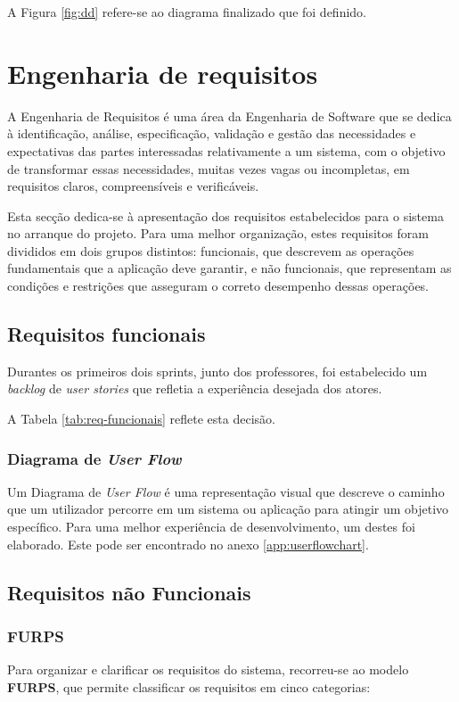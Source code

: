 A Figura \ref{fig:dd} refere-se ao diagrama finalizado que foi definido.

\section{Engenharia de requisitos}

A Engenharia de Requisitos é uma área da Engenharia de Software que se dedica à identificação, análise, especificação, validação e gestão das necessidades e expectativas das partes interessadas relativamente a um sistema, com o objetivo de transformar essas necessidades, muitas vezes vagas ou incompletas, em requisitos claros, compreensíveis e verificáveis.

Esta secção dedica-se à apresentação dos requisitos estabelecidos para o sistema no arranque do projeto. 
Para uma melhor organização, estes requisitos foram divididos em dois grupos distintos: funcionais, que descrevem as operações fundamentais que a aplicação deve garantir, e não funcionais, que representam as condições e restrições que asseguram o correto desempenho dessas operações.


\subsection{Requisitos funcionais}
\label{subsection:requisitos_funcionais}

Durantes os primeiros dois sprints, junto dos professores, foi estabelecido um \textit{backlog} de \textit{user stories} que refletia a experiência desejada dos atores. 

A Tabela \ref{tab:req-funcionais} reflete esta decisão.
\subsubsection{Diagrama de \textit{User Flow}}

Um Diagrama de \textit{User Flow} é uma representação visual que descreve o caminho que um utilizador percorre em um sistema ou aplicação para atingir um objetivo específico. Para uma melhor experiência de desenvolvimento, um destes foi elaborado. Este pode ser encontrado no anexo \ref{app:userflowchart}.    

\subsection{Requisitos não Funcionais}

\subsubsection{FURPS}
Para organizar e clarificar os requisitos do sistema, recorreu-se ao modelo \textbf{FURPS}, que permite classificar os requisitos em cinco categorias: 

